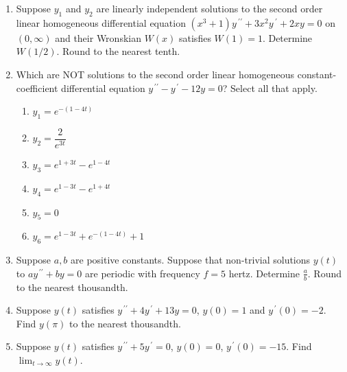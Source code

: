 \documentclass{ximera}
\begin{document}
\begin{enumerate}[label=(\arabic*)]

\item Suppose $y_{1}$ and $y_{2}$ are linearly independent solutions to the second order linear homogeneous differential equation $(x^3+1) y\,^{\prime\prime}+3x^2y\,^{\prime}+2xy=0$ on $(0,\infty)$ and their Wronskian $W(x)$ satisfies $W(1)=1$.  Determine $W(1/2)$.  Round to the nearest tenth.


\newpage


\item  Which are NOT solutions to the second order linear homogeneous constant-coefficient differential equation $y^{\,\prime\prime}-y^{\,\prime}-12y=0$?  Select all that apply.



\begin{enumerate}[label=(\alph*)]
\item $y_1=e^{-(1-4t)}$
\item $y_2=\dfrac{2}{e^{3t}}$
\item $y_3=e^{1+3t}-e^{1-4t}$  %
\item $y_4=e^{1-3t}-e^{1+4t}$
\item $y_5=0$
\item $y_6=e^{1-3t}+e^{-(1-4t)}+1$  %
\end{enumerate}



\item Suppose $a,b$ are positive constants.  Suppose that non-trivial solutions $y(t)$ to $ay^{\,\prime\prime}+by=0$ are periodic with frequency $f=5$ hertz.  Determine $\displaystyle \frac{a}{b}$.  Round to the nearest thousandth.




\item Suppose $y(t)$ satisfies $y^{\,\prime\prime}+4y^{\,\prime}+13y=0$, $y(0)=1$ and $y^{\,\prime}(0)=-2$.  Find $y(\pi)$ to the nearest thousandth.



\item Suppose $y(t)$ satisfies $y^{\,\prime\prime}+5y^{\,\prime}=0$, $y(0)=0$, $y^{\,\prime}(0)=-15$.  Find $\displaystyle \lim_{t\rightarrow \infty} y(t)$.


\end{enumerate}
\end{document}
